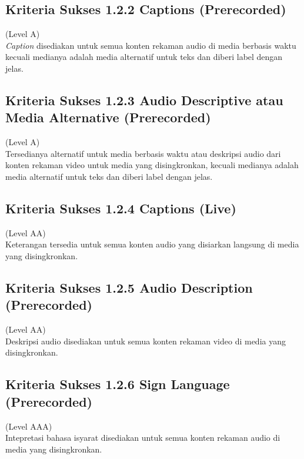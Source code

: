 \subsection{Kriteria Sukses 1.2.2 Captions (Prerecorded)}
\label{subsec:kriteria_1.2.2}
(Level A) \\

\textit{Caption} disediakan untuk semua konten rekaman audio di media berbasis waktu kecuali medianya adalah media alternatif untuk teks dan diberi label dengan jelas.


\subsection{Kriteria Sukses 1.2.3 Audio Descriptive atau Media Alternative (Prerecorded)}
\label{subsec:kriteria_1.2.3}
(Level A) \\

Tersedianya alternatif untuk media berbasis waktu atau deskripsi audio dari konten rekaman video untuk media yang disingkronkan, kecuali medianya adalah media alternatif untuk teks dan diberi label dengan jelas.


\subsection{Kriteria Sukses 1.2.4 Captions (Live)}
\label{subsec:kriteria_1.2.4}
(Level AA) \\

Keterangan tersedia untuk semua konten audio yang disiarkan langsung di media yang disingkronkan.


\subsection{Kriteria Sukses 1.2.5 Audio Description (Prerecorded)}
\label{subsec:kriteria_1.2.5}
(Level AA) \\

Deskripsi audio disediakan untuk semua konten rekaman video di media yang disingkronkan.


\subsection{Kriteria Sukses 1.2.6 Sign Language (Prerecorded)}
\label{subsec:kriteria_1.2.6}
(Level AAA) \\

Intepretasi bahasa isyarat disediakan untuk semua konten rekaman audio di media yang disingkronkan.


